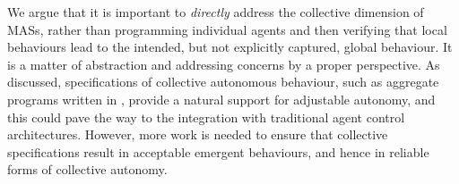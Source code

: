 We argue that it is important 
 to \emph{directly} address the collective dimension of MASs,
 rather than programming individual agents
 and then verifying that local behaviours lead to the intended, but not explicitly captured, global behaviour.
%
It is a matter of abstraction
 and addressing concerns by a proper perspective.
%
As discussed,
 specifications of collective autonomous behaviour,
 such as aggregate programs written in \scafi{},
 provide a natural support for adjustable autonomy,
 and this could pave the way to the integration
 with traditional agent control architectures.
%
However, more work is needed
 to ensure that collective specifications 
 result in acceptable emergent behaviours,
 and hence in reliable forms of collective autonomy.

